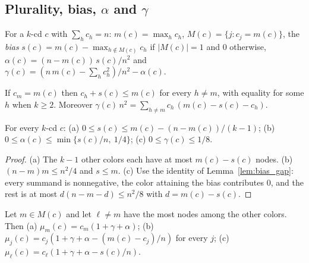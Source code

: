 \subsection{Plurality, bias, \texorpdfstring{$\alpha$}{alpha} and \texorpdfstring{$\gamma$}{gamma}}

\begin{definition}\label{def:quantities}
  \leanok
  For a $k$-cd $c$ with $\sum_h c_h = n$: $m(c) = \max_h c_h$,
  $M(c) = \{j : c_j = m(c)\}$, the \emph{bias}
  $s(c) = m(c) - \max_{h \notin M(c)} c_h$ if $|M(c)| = 1$ and $0$ otherwise,
  $\alpha(c) = (n - m(c))\,s(c)/n^2$ and
  $\gamma(c) = (n\,m(c) - \sum_h c_h^2)/n^2 - \alpha(c)$.
\end{definition}

\begin{lemma}\label{lem:bias_gap}
  \leanok
  If $c_m = m(c)$ then $c_h + s(c) \le m(c)$ for every $h \ne m$, with
  equality for some $h$ when $k \ge 2$. Moreover
  $\gamma(c)\,n^2 = \sum_{h \ne m} c_h\,(m(c) - s(c) - c_h)$.
\end{lemma}

\begin{lemma}[Lemma 3.1]\label{lem:3_1}
  \leanok
  For every $k$-cd $c$:
  (a) $0 \le s(c) \le m(c) - (n - m(c))/(k-1)$;
  (b) $0 \le \alpha(c) \le \min\{s(c)/n,\ 1/4\}$;
  (c) $0 \le \gamma(c) \le 1/8$.
\end{lemma}

\begin{proof}
  (a) The $k-1$ other colors each have at most $m(c) - s(c)$ nodes.
  (b) $(n - m)m \le n^2/4$ and $s \le m$.
  (c) Use the identity of Lemma~\ref{lem:bias_gap}: every summand is
  nonnegative, the color attaining the bias contributes $0$, and the rest is
  at most $d(n - m - d) \le n^2/8$ with $d = m(c) - s(c)$.
\end{proof}

\begin{lemma}[Lemma 3.2]\label{lem:3_2}
  \leanok
  Let $m \in M(c)$ and let $\ell \ne m$ have the most nodes among the other
  colors. Then (a) $\mu_m(c) = c_m(1 + \gamma + \alpha)$;
  (b) $\mu_j(c) = c_j(1 + \gamma + \alpha - (m(c) - c_j)/n)$ for every $j$;
  (c) $\mu_\ell(c) = c_\ell(1 + \gamma + \alpha - s(c)/n)$.
\end{lemma}

